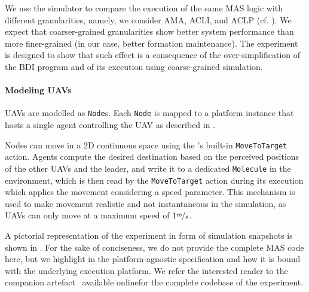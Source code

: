 We use the simulator to compare the execution of the same \ac{MAS} logic
with different granularities, namely,
    we consider \ac{AMA}, \ac{ACLI}, and \ac{ACLP} (cf. ).
%
We expect that coarser-grained granularities show better system performance
than more finer-grained
(in our case, better formation maintenance).
The experiment is designed to show that such effect is 
a consequence of the over-simplification of the \ac{BDI} program
and of its execution using coarse-grained simulation.
%

\paragraph{Modeling \acp{UAV}}

\acp{UAV} are modelled as \alchemist{} \texttt{Node}s.
Each \texttt{Node} is mapped to a \jakta{} platform instance
that hosts a single \jakta{} agent controlling the \ac{UAV} as described in .

Nodes can move in a 2D continuous space using the \alchemist{}'s built-in \texttt{MoveToTarget} action. Agents compute the desired destination based on the perceived positions of the other \acp{UAV} and the leader, and write it to a dedicated \texttt{Molecule} in the environment, which is then read by the \texttt{MoveToTarget} action during its execution which applies the movement considering a speed parameter.
%
This mechanism is used to make movement realistic and not instantaneous in the simulation, as \acp{UAV} can only move at a maximum speed of $1\nicefrac{m}{s}$.

A pictorial representation of the experiment in form of simulation snapshots is shown in .
%
For the sake of conciseness,
we do not provide the complete \ac{MAS} code here,
but we highlight in  the platform-agnostic specification and how it is bound with the
underlying execution platform.
%
We refer the interested reader to the companion artefact~\cite{zenodojaktajaamas}
available online\footnotemark for the complete codebase of the experiment.


